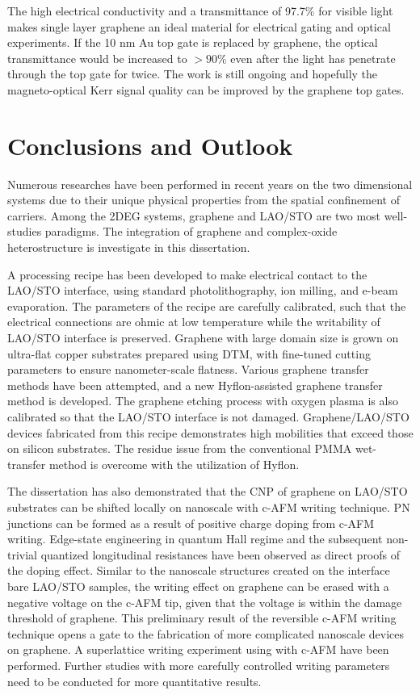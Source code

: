 \documentclass[pdflatex, sectionletters, 12pt]{pittetd}    %
\begin{document}
The high electrical conductivity and a transmittance of 97.7\% for visible light\cite{nair2008fine} makes single layer graphene an ideal material for electrical gating and optical experiments. If the 10 nm Au top gate is replaced by graphene, the optical transmittance would be increased to $> 90\%$ even after the light has penetrate through the top gate for twice. The work is still ongoing and hopefully the magneto-optical Kerr signal quality can be improved by the graphene top gates.

\chapter{Conclusions and Outlook}

Numerous researches have been performed in recent years on the two dimensional systems due to their unique physical properties from the spatial confinement of carriers. Among the 2DEG systems, graphene and LAO/STO are two most well-studies paradigms. The integration of graphene and complex-oxide heterostructure is investigate in this dissertation. 

A processing recipe has been developed to make electrical contact to the LAO/STO interface, using standard photolithography, ion milling, and e-beam evaporation. The parameters of the recipe are carefully calibrated, such that the electrical connections are ohmic at low temperature while the writability of LAO/STO interface is preserved. Graphene with large domain size is grown on ultra-flat copper substrates prepared using DTM, with fine-tuned cutting parameters to ensure nanometer-scale flatness. Various graphene transfer methods have been attempted, and a new Hyflon-assisted graphene transfer method is developed. The graphene etching process with oxygen plasma is also calibrated so that the LAO/STO interface is not damaged. Graphene/LAO/STO devices fabricated from this recipe demonstrates high mobilities that exceed those on silicon substrates. The residue issue from the conventional PMMA wet-transfer method is overcome with the utilization of Hyflon.

The dissertation has also demonstrated that the CNP of graphene on LAO/STO substrates can be shifted locally on nanoscale with c-AFM writing technique. PN junctions can be formed as a result of positive charge doping from c-AFM writing. Edge-state engineering in quantum Hall regime and the subsequent non-trivial quantized longitudinal resistances have been observed as direct proofs of the doping effect. Similar to the nanoscale structures created on the interface bare LAO/STO samples, the writing effect on graphene can be erased with a negative voltage on the c-AFM tip, given that the voltage is within the damage threshold of graphene. This preliminary result of the reversible c-AFM writing technique opens a gate to the fabrication of more complicated nanoscale devices on graphene. A superlattice writing experiment using with c-AFM have been performed. Further studies with more carefully controlled writing parameters need to be conducted for more quantitative results.
\end{document}
